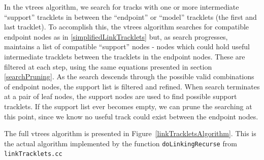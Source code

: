 In the vtrees algorithm, we search for tracks with one or more
intermediate ``support'' tracklets in between the ``endpoint'' or
``model'' tracklets (the first and last tracklet).  To accomplish
this, the vtrees algorithm searches for compatible endpoint nodes as
in \ref{simplifiedLinkTracklets} but, as search progresses, maintains
a list of compatible ``support'' nodes - nodes which could hold useful
intermediate tracklets between the tracklets in the endpoint nodes.
These are filtered at each step, using the same equations presented in
section \ref{searchPruning}.  As the search descends through the
possible valid combinations of endpoint nodes, the support list is
filtered and refined.  When search terminates at a pair of leaf nodes,
the support nodes are used to find possible support tracklets.  If the
support list ever becomes empty, we can prune the searching at this
point, since we know no useful track could exist between the endpoint
nodes.

The full vtrees algorithm is presented in
Figure~\ref{linkTrackletsAlgorithm}.  This is the actual algorithm
implemented by the function {\tt doLinkingRecurse} from {\tt linkTracklets.cc}


